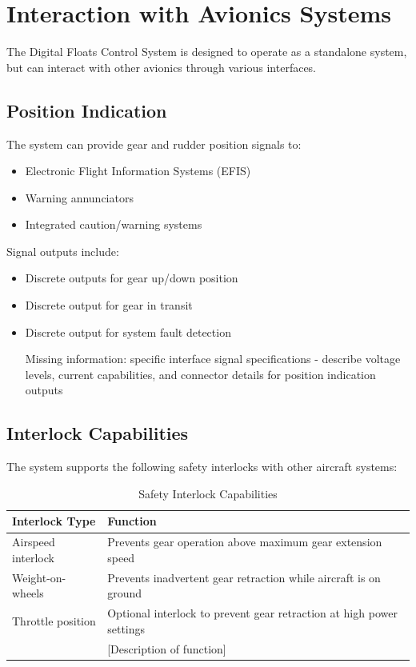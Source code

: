 \documentclass[12pt,a4paper,twoside,openright]{book}
\newcommand{\tabletextfont}{\normalfont\rmfamily}
\newcommand{\tableheadfont}{\normalfont\bfseries}
\begin{document}
\section{Interaction with Avionics Systems}

The Digital Floats Control System is designed to operate as a standalone system, but can interact with other avionics through various interfaces.

\subsection{Position Indication}

The system can provide gear and rudder position signals to:
\begin{itemize}
    \item Electronic Flight Information Systems (EFIS)
    \item Warning annunciators
    \item Integrated caution/warning systems
\end{itemize}

Signal outputs include:
\begin{itemize}
    \item Discrete outputs for gear up/down position
    \item Discrete output for gear in transit
    \item Discrete output for system fault detection
    \item [Missing information: specific interface signal specifications - describe voltage levels, current capabilities, and connector details for position indication outputs]
\end{itemize}

\subsection{Interlock Capabilities}

The system supports the following safety interlocks with other aircraft systems:

\begin{table}[h]
\centering
\setlength{\tabcolsep}{5pt} %
\begin{tabular}{|p{}|p{}|}
\hline
\tableheadfont\textbf{Interlock Type} & \tableheadfont\textbf{Function} \\
\hline
\tabletextfont Airspeed interlock & Prevents gear operation above maximum gear extension speed \\
\hline
\tabletextfont Weight-on-wheels & Prevents inadvertent gear retraction while aircraft is on ground \\
\hline
\tabletextfont Throttle position & Optional interlock to prevent gear retraction at high power settings \\
\hline
\tabletextfont [Missing information: additional aircraft-specific interlocks] & [Description of function] \\
\hline
\end{tabular}
\caption{Safety Interlock Capabilities}
\end{table}
\end{document}
